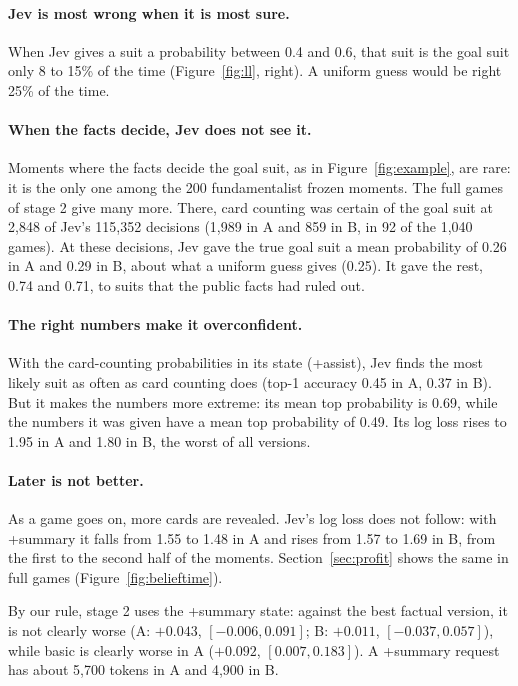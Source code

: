 \documentclass[10pt]{article}
\begin{document}
\paragraph{Jev is most wrong when it is most sure.} When Jev gives a suit a probability between 0.4 and 0.6, that suit
is the goal suit only 8 to 15\% of the time (Figure~\ref{fig:ll}, right). A uniform guess would be right 25\% of the
time.

\paragraph{When the facts decide, Jev does not see it.} Moments where the facts decide the goal suit, as in
Figure~\ref{fig:example}, are rare: it is the only one among the 200 fundamentalist frozen moments. The full games of
stage 2 give many more. There, card counting was certain of the goal suit at 2,848 of Jev's 115,352 decisions (1,989 in
A and 859 in B, in 92 of the 1,040 games). At these decisions, Jev gave the true goal suit a mean probability of 0.26 in
A and 0.29 in B, about what a uniform guess gives (0.25). It gave the rest, 0.74 and 0.71, to suits that the public
facts had ruled out.

\paragraph{The right numbers make it overconfident.} With the card-counting probabilities in its state (+assist), Jev
finds the most likely suit as often as card counting does (top-1 accuracy 0.45 in A, 0.37 in B). But it makes the
numbers more extreme: its mean top probability is 0.69, while the numbers it was given have a mean top probability of
0.49. Its log loss rises to 1.95 in A and 1.80 in B, the worst of all versions.

\paragraph{Later is not better.} As a game goes on, more cards are revealed. Jev's log loss does not follow: with
+summary it falls from 1.55 to 1.48 in A and rises from 1.57 to 1.69 in B, from the first to the second half of the
moments. Section~\ref{sec:profit} shows the same in full games (Figure~\ref{fig:belieftime}).

By our rule, stage 2 uses the +summary state: against the best factual version, it is not clearly worse (A: $+0.043$,
$[-0.006, 0.091]$; B: $+0.011$, $[-0.037, 0.057]$), while basic is clearly worse in A ($+0.092$, $[0.007, 0.183]$).
A +summary request has about 5,700 tokens in A and 4,900 in B.
\end{document}
